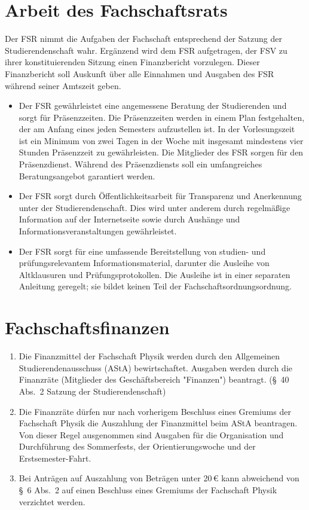 \section{Arbeit des Fachschaftsrats}
Der FSR nimmt die Aufgaben der Fachschaft entsprechend der Satzung der Studierendenschaft wahr. Ergänzend wird dem FSR aufgetragen, der FSV zu ihrer konstituierenden Sitzung einen Finanzbericht vorzulegen. Dieser Finanzbericht soll Auskunft über alle Einnahmen und Ausgaben des FSR während seiner Amtszeit geben.
\begin{itemize}
	\item Der FSR gewährleistet eine angemessene Beratung der Studierenden und sorgt für Präsenzzeiten. Die Präsenzzeiten werden in einem Plan festgehalten, der am Anfang eines jeden Semesters aufzustellen ist. In der Vorlesungszeit ist ein Minimum von zwei Tagen in der Woche mit insgesamt mindestens vier Stunden Präsenzzeit zu gewährleisten. Die Mitglieder des FSR sorgen für den Präsenzdienst. Während des Präsenzdiensts soll ein umfangreiches Beratungsangebot garantiert werden.
	\item Der FSR sorgt durch Öffentlichkeitsarbeit für Transparenz und Anerkennung unter der Studierendenschaft. Dies wird unter anderem durch regelmäßige Information auf der Internetseite sowie durch Aushänge und Informationsveranstaltungen gewährleistet.
	\item Der FSR sorgt für eine umfassende Bereitstellung von studien- und prüfungsrelevantem Informationsmaterial, darunter die Ausleihe von Altklausuren und Prüfungsprotokollen. Die Ausleihe ist in einer separaten Anleitung geregelt; sie bildet keinen Teil der Fachschaftsordnungsordnung.
\end{itemize}

\section{Fachschaftsfinanzen}
\begin{enumerate}
	\item Die Finanzmittel der Fachschaft Physik werden durch den Allgemeinen Studierendenausschuss (AStA) bewirtschaftet. Ausgaben werden durch die Finanzräte (Mitglieder des Geschäftsbereich "Finanzen") beantragt. (§~40 Abs.~2 Satzung der Studierendenschaft)
	\item Die Finanzräte dürfen nur nach vorherigem Beschluss eines Gremiums der Fachschaft Physik die Auszahlung der Finanzmittel beim AStA beantragen. Von dieser Regel ausgenommen sind Ausgaben für die Organisation und Durchführung des Sommerfests, der Orientierungswoche und der Erstsemester-Fahrt.
	\item Bei Anträgen auf Auszahlung von Beträgen unter 20\,€ kann abweichend von §~6 Abs.~2 auf einen Beschluss eines Gremiums der Fachschaft Physik verzichtet werden.
\end{enumerate}

